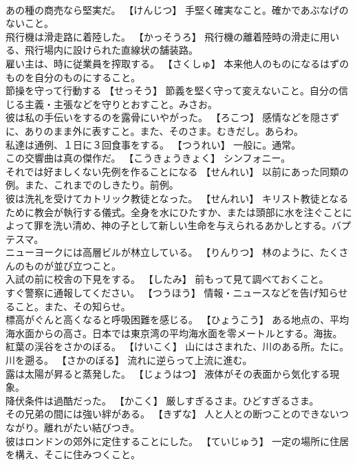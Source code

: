 \documentclass[8pt]{extreport}
\begin{document}
\begin{CJK}{UTF8}{min}
\\	あの種の商売なら堅実だ。	【けんじつ】 手堅く確実なこと。確かであぶなげのないこと。
\\	飛行機は滑走路に着陸した。	【かっそうろ】 飛行機の離着陸時の滑走に用いる、飛行場内に設けられた直線状の舗装路。
\\	雇い主は、時に従業員を搾取する。	【さくしゅ】 本来他人のものになるはずのものを自分のものにすること。
\\	節操を守って行動する	【せっそう】 節義を堅く守って変えないこと。自分の信じる主義・主張などを守りとおすこと。みさお。
\\	彼は私の手伝いをするのを露骨にいやがった。	【ろこつ】 感情などを隠さずに、ありのまま外に表すこと。また、そのさま。むきだし。あらわ。
\\	私達は通例、１日に３回食事をする。	【つうれい】 一般に。通常。
\\	この交響曲は真の傑作だ。	【こうきょうきょく】 シンフォニー。
\\	それでは好ましくない先例を作ることになる	【せんれい】 以前にあった同類の例。また、これまでのしきたり。前例。
\\	彼は洗礼を受けてカトリック教徒となった。	【せんれい】 キリスト教徒となるために教会が執行する儀式。全身を水にひたすか、または頭部に水を注ぐことによって罪を洗い清め、神の子として新しい生命を与えられるあかしとする。バプテスマ。
\\	ニューヨークには高層ビルが林立している。	【りんりつ】 林のように、たくさんのものが並び立つこと。
\\	入試の前に校舎の下見をする。	【したみ】 前もって見て調べておくこと。
\\	すぐ警察に通報してください。	【つうほう】 情報・ニュースなどを告げ知らせること。また、その知らせ。
\\	標高がぐんと高くなると呼吸困難を感じる。	【ひょうこう】 ある地点の、平均海水面からの高さ。日本では東京湾の平均海水面を零メートルとする。海抜。
\\	紅葉の渓谷をさかのぼる。	【けいこく】 山にはさまれた、川のある所。たに。
\\	川を遡る。	【さかのぼる】 流れに逆らって上流に進む。
\\	露は太陽が昇ると蒸発した。	【じょうはつ】 液体がその表面から気化する現象。
\\	降伏条件は過酷だった。	【かこく】 厳しすぎるさま。ひどすぎるさま。
\\	その兄弟の間には強い絆がある。	【きずな】 人と人との断つことのできないつながり。離れがたい結びつき。
\\	彼はロンドンの郊外に定住することにした。	【ていじゅう】 一定の場所に住居を構え、そこに住みつくこと。

\end{CJK}
\end{document}
